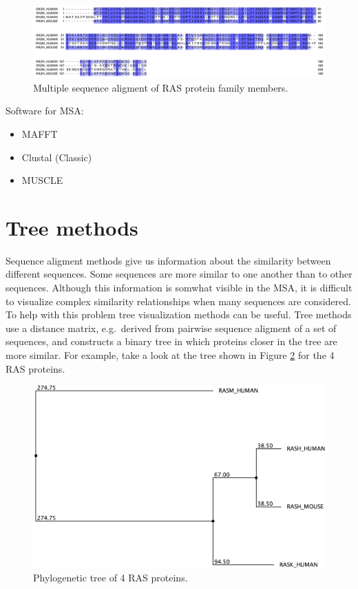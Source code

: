 \documentclass[]{book}
\providecommand{\tightlist}{%
  \setlength{\itemsep}{0pt}\setlength{\parskip}{0pt}}
\theoremstyle{definition}
\theoremstyle{definition}
\theoremstyle{definition}
\theoremstyle{remark}
\begin{document}
\begin{figure}
\centering
\includegraphics{pic/msa.pdf}
\caption{\label{fig:unnamed-chunk-9}Multiple sequence aligment of RAS
protein family members.}
\end{figure}

Software for MSA:

\begin{itemize}
\tightlist
\item
  MAFFT
\item
  Clustal (Classic)
\item
  MUSCLE
\end{itemize}

\section{Tree methods}\label{tree-methods}

Sequence aligment methods give us information about the similarity
between different sequences. Some sequences are more similar to one
another than to other sequences. Although this information is somwhat
visible in the MSA, it is difficult to visualize complex similarity
relationships when many sequences are considered. To help with this
problem tree visualization methods can be useful. Tree methods use a
distance matrix, e.g.~derived from pairwise sequence aligment of a set
of sequences, and constructs a binary tree in which proteins closer in
the tree are more similar. For example, take a look at the tree shown in
Figure \ref{fig:tree-ras} for the 4 RAS proteins.

\begin{figure}
\centering
\includegraphics{pic/tree_ras.pdf}
\caption{\label{fig:tree-ras}Phylogenetic tree of 4 RAS proteins.}
\end{figure}
\end{document}
